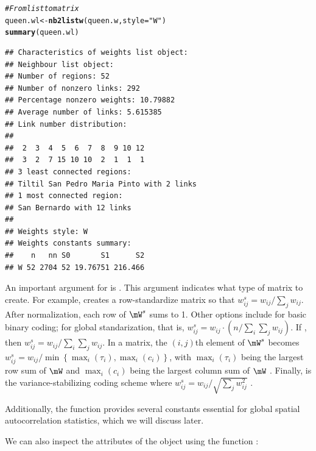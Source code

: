 \documentclass[english,12pt]{book}\usepackage[]{graphicx}\usepackage[]{xcolor}
\makeatletter
\newcommand{\hlsng}[1]{\textcolor[rgb]{0.192,0.494,0.8}{#1}}%
\newcommand{\hlcom}[1]{\textcolor[rgb]{0.678,0.584,0.686}{\textit{#1}}}%
\newcommand{\hldef}[1]{\textcolor[rgb]{0.345,0.345,0.345}{#1}}%
\newcommand{\hlkwb}[1]{\textcolor[rgb]{0.69,0.353,0.396}{#1}}%
\newcommand{\hlkwc}[1]{\textcolor[rgb]{0.333,0.667,0.333}{#1}}%
\newcommand{\hlkwd}[1]{\textcolor[rgb]{0.737,0.353,0.396}{\textbf{#1}}}%
\newenvironment{kframe}{%
 \def\at@end@of@kframe{}%
 \ifinner\ifhmode%
  \def\at@end@of@kframe{\end{minipage}}%
  \begin{minipage}{\columnwidth}%
 \fi\fi%
 \def\FrameCommand##1{\hskip\@totalleftmargin \hskip-\fboxsep
 \colorbox{shadecolor}{##1}\hskip-\fboxsep
     \hskip-\linewidth \hskip-\@totalleftmargin \hskip\columnwidth}%
 \MakeFramed {\advance\hsize-\width
   \@totalleftmargin\z@ \linewidth\hsize
   \@setminipage}}%
 {\par\unskip\endMakeFramed%
 \at@end@of@kframe}
\newenvironment{knitrout}{}{} %
\makeatother
\begin{document}
\begin{knitrout}
\color{fgcolor}\begin{kframe}
\begin{alltt}
\hlcom{# From list to matrix}
\hldef{queen.wl} \hlkwb{<-} \hlkwd{nb2listw}\hldef{(queen.w,} \hlkwc{style} \hldef{=} \hlsng{"W"}\hldef{)}
\hlkwd{summary}\hldef{(queen.wl)}
\end{alltt}
\begin{verbatim}
## Characteristics of weights list object:
## Neighbour list object:
## Number of regions: 52 
## Number of nonzero links: 292 
## Percentage nonzero weights: 10.79882 
## Average number of links: 5.615385 
## Link number distribution:
## 
##  2  3  4  5  6  7  8  9 10 12 
##  3  2  7 15 10 10  2  1  1  1 
## 3 least connected regions:
## Tiltil San Pedro Maria Pinto with 2 links
## 1 most connected region:
## San Bernardo with 12 links
## 
## Weights style: W 
## Weights constants summary:
##    n   nn S0       S1      S2
## W 52 2704 52 19.76751 216.466
\end{verbatim}
\end{kframe}
\end{knitrout}

An important argument for  is . This argument indicates what type of matrix to create. For example,  creates a row-standardize matrix so that $w^s_{ij} = w_{ij}/ \sum_j w_{ij}$. After normalization, each row of $\mW^s$ sums to 1. Other options include  for basic binary coding;  for global standarization, that is, $w^s_{ij} = w_{ij} \cdot (n/ \sum_{i}\sum_j w_{ij})$. If , then $w^s_{ij} = w_{ij}/ \sum_i\sum_j w_{ij}$. In a  matrix, the $(i,j)$th element of $\mW^s$  becomes $w^s_{ij} = w_{ij} / \min\left\lbrace \max_i(\tau_i), \max_i(c_i)\right\rbrace$, with $\max_i(\tau_i)$ being the largest row sum of $\mW$ and $\max_i(c_i)$ being the largest column sum of $\mW$ \citep{kelejian2010specification}. Finally,  is the variance-stabilizing coding scheme where $w^s_{ij} = w_{ij}/ \sqrt{\sum_j w_{ij} ^2}$ \citep{tiefelsdorf1999variance}. 

Additionally, the  function provides several constants essential for global spatial autocorrelation statistics, which we will discuss later. 

We can also inspect the attributes of the object using the function :
\end{document}
